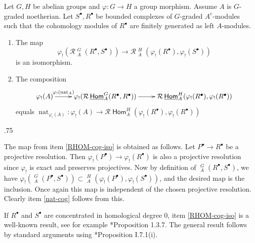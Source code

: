 \documentclass[11pt,fleqn]{article}
\makeatletter
\renewenvironment{proof}[1][\textit{Proof}]{\par
 \pushQED{\qed}%
 \normalfont \topsep.75\paraskip\relax
 \trivlist
 \item[\hskip\labelsep
    \itshape
  #1\@addpunct{.}]\ignorespaces
}{%
 \popQED\endtrivlist\@endpefalse
}
\renewcommand\to{\longrightarrow}
\renewcommand\phi{\varphi}
\newcommand\R{\mathcal R}
\DeclareMathOperator\Hom{\mathsf{Hom}}
\DeclareMathOperator\HOM{\underline{\mathsf{Hom}}}
\DeclareMathOperator\nat{nat}
\makeatother
\begin{document}
\begin{Lemma}
\label{natural-map-lemma}
Let $G,H$ be abelian groups and $\phi: G \to H$ a group morphism. Assume $A$ 
is $G$-graded noetherian. Let $S^\bullet, R^\bullet$ be bounded 
complexes of $G$-graded $A^e$-modules such that the cohomology modules of 
$R^\bullet$ are finitely generated as left $A$-modules. 
\begin{enumerate}
\item 
\label{RHOM-cog-iso}
The map
\[
 \phi_!(\R\HOM_A^G(R^\bullet, S^\bullet)) 
  \to \R\HOM_A^H(\phi_!(R^\bullet), \phi_!(S^\bullet))
\]
is an isomorphism.

\item 
\label{nat-cog}
The composition 
\begin{align*}
\xymatrix{
\phi_!(A) 
  \ar[r]^-{\phi_!(\nat_A)}
  &\phi_!(\R\HOM_A^G(R^\bullet, R^\bullet)) \ar[r]
  &\R\HOM_A^H(\phi_!(R^\bullet), \phi_!(R^\bullet))
}
\end{align*}
equals $\nat_{\phi_!(A)}: \phi_!(A) \to \R\Hom_A^H(\phi_!(R^\bullet), 
\phi_!(R^\bullet))$
\end{enumerate}
\end{Lemma}
\begin{proof}
The map from item \ref{RHOM-cog-iso} is obtained as follows. Let $P^\bullet
\to R^\bullet$ be a projective resolution. Then $\phi_!(P^\bullet) \to 
\phi_!(R^\bullet)$ is also a projective resolution since $\phi_!$ is exact and 
preserves projectives. Now by definition of $\HOM^G_A(R^\bullet, S^\bullet)$, 
we have $\phi_!(\HOM_A^{G}(P^\bullet, S^\bullet)) \subset \HOM_A^{H}
(\phi_!(P^\bullet), \phi_!(S^\bullet))$, and the desired map is the inclusion. 
Once again this map is independent of the chosen projective resolution. 
Clearly item \ref{nat-cog} follows from this.

If $R^\bullet$ and $S^\bullet$ are concentrated in homological degree $0$,
item \ref{RHOM-cog-iso} is a well-known result, see for example 
\cite{RZ-twisted}*{Proposition 1.3.7}. The general result follows by standard 
arguments using \cite{Hart-RD}*{Proposition I.7.1(i)}.
\end{proof}
\end{document}
